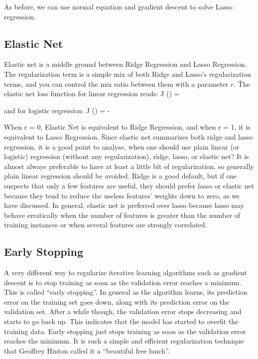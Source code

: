As before, we can use normal equation and gradient descent to solve Lasso regression.

\subsection{Elastic Net}

Elastic net is a middle ground between Ridge Regression and Lasso Regression. The regularization term is a simple
mix of both Ridge and Lasso's regularization terms, and you can control the mix ratio between them with a parameter
$r$. \v

The elastic net loss function for linear regression reads:
\bse
J () =  
\ese

and for logistic regression:
\bse
J () = -  
\ese

When r = 0, Elastic Net is equivalent to Ridge Regression, and when r = 1, it is equivalent to Lasso Regression. \v

Since elastic net summarizes both ridge and lasso regression, it is a good point to analyse, when one should use
plain linear (or logistic) regression (without any regularization), ridge, lasso, or elastic net? It is almost always
preferable to have at least a little bit of regularization, so generally plain linear regression should be avoided.
Ridge is a good default, but if one suspects that only a few features are useful, they should prefer lasso or elastic
net because they tend to reduce the useless features' weights down to zero, as we have discussed. In general, elastic
net is preferred over lasso because lasso may behave erratically when the number of features is greater than the
number of training instances or when several features are strongly correlated.

\subsection{Early Stopping}

A very different way to regularize iterative learning algorithms such as gradient descent is to stop training as soon
as the validation error reaches a minimum. This is called ``early stopping''. In general as the algorithm learns,
its prediction error on the training set goes down, along with its prediction error on the validation set. After a
while though, the validation error stops decreasing and starts to go back up. This indicates that the model has
started to overfit the training data. Early stopping just stops training as soon as the validation error reaches the
minimum. It is such a simple and efficient regularization technique that Geoffrey Hinton called it a ``beautiful free
lunch''.

